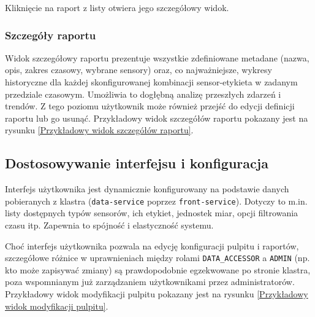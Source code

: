 Kliknięcie na raport z listy otwiera jego szczegółowy widok.



\subsubsection{Szczegóły raportu}
Widok szczegółowy raportu prezentuje wszystkie zdefiniowane metadane (nazwa, opis, zakres czasowy, wybrane sensory) oraz, co najważniejsze, wykresy historyczne dla każdej skonfigurowanej kombinacji sensor-etykieta w zadanym przedziale czasowym. Umożliwia to dogłębną analizę przeszłych zdarzeń i trendów. Z tego poziomu użytkownik może również przejść do edycji definicji raportu lub go usunąć. Przykładowy widok szczegółów raportu pokazany jest na rysunku \ref{Przykładowy widok szczegółów raportu}.


\subsection{Dostosowywanie interfejsu i konfiguracja}
Interfejs użytkownika jest dynamicznie konfigurowany na podstawie danych pobieranych z klastra (\texttt{data-service} poprzez \texttt{front-service}). Dotyczy to m.in. listy dostępnych typów sensorów, ich etykiet, jednostek miar, opcji filtrowania czasu itp. Zapewnia to spójność i elastyczność systemu.

Choć interfejs użytkownika pozwala na edycję konfiguracji pulpitu i raportów, szczegółowe różnice w uprawnieniach między rolami \texttt{DATA\_ACCESSOR} a \texttt{ADMIN} (np. kto może zapisywać zmiany) są prawdopodobnie egzekwowane po stronie klastra, poza wspomnianym już zarządzaniem użytkownikami przez administratorów. Przykładowy widok modyfikacji pulpitu pokazany jest na rysunku \ref{Przykładowy widok modyfikacji pulpitu}.

